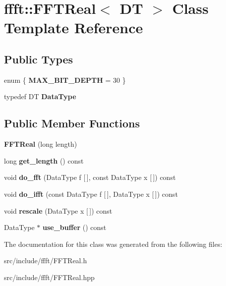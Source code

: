 \hypertarget{classffft_1_1FFTReal}{}\section{ffft\+:\+:F\+F\+T\+Real$<$ DT $>$ Class Template Reference}
\label{classffft_1_1FFTReal}
\subsection*{Public Types}
\begin{DoxyCompactItemize}
\item 
\mbox{\label{classffft_1_1FFTReal_a39f5a2ec14c15f9198268500716e5dba}} 
enum \{ {\bfseries M\+A\+X\+\_\+\+B\+I\+T\+\_\+\+D\+E\+P\+TH} = 30
 \}
\item 
\mbox{\label{classffft_1_1FFTReal_a606148f1cf8c3b7d705473932fc063d1}} 
typedef DT {\bfseries Data\+Type}
\end{DoxyCompactItemize}
\subsection*{Public Member Functions}
\begin{DoxyCompactItemize}
\item 
\mbox{\label{classffft_1_1FFTReal_a627db4d781235302c3a229fc4d7a10ba}} 
{\bfseries F\+F\+T\+Real} (long length)
\item 
\mbox{\label{classffft_1_1FFTReal_ac7e604c1ab7d7281d6b17ae1aa86ff36}} 
long {\bfseries get\+\_\+length} () const
\item 
\mbox{\label{classffft_1_1FFTReal_aefe76dd83673ecb01d1216b4c636d1e0}} 
void {\bfseries do\+\_\+fft} (Data\+Type f \mbox{[}$\,$\mbox{]}, const Data\+Type x \mbox{[}$\,$\mbox{]}) const
\item 
\mbox{\label{classffft_1_1FFTReal_aec086bf8d016e8cf9cd7351502c92551}} 
void {\bfseries do\+\_\+ifft} (const Data\+Type f \mbox{[}$\,$\mbox{]}, Data\+Type x \mbox{[}$\,$\mbox{]}) const
\item 
\mbox{\label{classffft_1_1FFTReal_a80050e7511e3662d121720f56dbd9cd7}} 
void {\bfseries rescale} (Data\+Type x \mbox{[}$\,$\mbox{]}) const
\item 
\mbox{\label{classffft_1_1FFTReal_ae91999ceb42d32eef5bdd0d16db989d5}} 
Data\+Type $\ast$ {\bfseries use\+\_\+buffer} () const
\end{DoxyCompactItemize}


The documentation for this class was generated from the following files\+:\begin{DoxyCompactItemize}
\item 
src/include/ffft/F\+F\+T\+Real.\+h\item 
src/include/ffft/F\+F\+T\+Real.\+hpp\end{DoxyCompactItemize}
